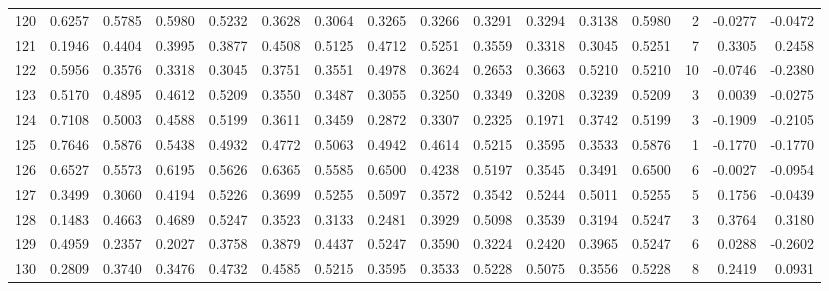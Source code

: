 \begin{tabular}{lrrrrrrrrrrrrrrr}
120 &      0.6257 &  0.5785 &  0.5980 &  0.5232 &  0.3628 &  0.3064 &  0.3265 &  0.3266 &  0.3291 &  0.3294 &   0.3138 &     0.5980 &      2 &                   -0.0277 &                    -0.0472 \\
121 &      0.1946 &  0.4404 &  0.3995 &  0.3877 &  0.4508 &  0.5125 &  0.4712 &  0.5251 &  0.3559 &  0.3318 &   0.3045 &     0.5251 &      7 &                    0.3305 &                     0.2458 \\
122 &      0.5956 &  0.3576 &  0.3318 &  0.3045 &  0.3751 &  0.3551 &  0.4978 &  0.3624 &  0.2653 &  0.3663 &   0.5210 &     0.5210 &     10 &                   -0.0746 &                    -0.2380 \\
123 &      0.5170 &  0.4895 &  0.4612 &  0.5209 &  0.3550 &  0.3487 &  0.3055 &  0.3250 &  0.3349 &  0.3208 &   0.3239 &     0.5209 &      3 &                    0.0039 &                    -0.0275 \\
124 &      0.7108 &  0.5003 &  0.4588 &  0.5199 &  0.3611 &  0.3459 &  0.2872 &  0.3307 &  0.2325 &  0.1971 &   0.3742 &     0.5199 &      3 &                   -0.1909 &                    -0.2105 \\
125 &      0.7646 &  0.5876 &  0.5438 &  0.4932 &  0.4772 &  0.5063 &  0.4942 &  0.4614 &  0.5215 &  0.3595 &   0.3533 &     0.5876 &      1 &                   -0.1770 &                    -0.1770 \\
126 &      0.6527 &  0.5573 &  0.6195 &  0.5626 &  0.6365 &  0.5585 &  0.6500 &  0.4238 &  0.5197 &  0.3545 &   0.3491 &     0.6500 &      6 &                   -0.0027 &                    -0.0954 \\
127 &      0.3499 &  0.3060 &  0.4194 &  0.5226 &  0.3699 &  0.5255 &  0.5097 &  0.3572 &  0.3542 &  0.5244 &   0.5011 &     0.5255 &      5 &                    0.1756 &                    -0.0439 \\
128 &      0.1483 &  0.4663 &  0.4689 &  0.5247 &  0.3523 &  0.3133 &  0.2481 &  0.3929 &  0.5098 &  0.3539 &   0.3194 &     0.5247 &      3 &                    0.3764 &                     0.3180 \\
129 &      0.4959 &  0.2357 &  0.2027 &  0.3758 &  0.3879 &  0.4437 &  0.5247 &  0.3590 &  0.3224 &  0.2420 &   0.3965 &     0.5247 &      6 &                    0.0288 &                    -0.2602 \\
130 &      0.2809 &  0.3740 &  0.3476 &  0.4732 &  0.4585 &  0.5215 &  0.3595 &  0.3533 &  0.5228 &  0.5075 &   0.3556 &     0.5228 &      8 &                    0.2419 &                     0.0931 \\

\end{tabular}
